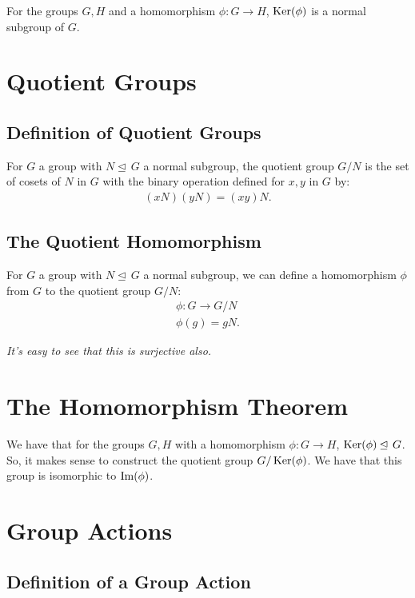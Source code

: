 \documentclass[a4paper, 12pt, twoside]{article}
\begin{document}
For the groups $G, H$ and a homomorphism $\phi : G \to H$,
$\operatorname{Ker}(\phi)$ is a normal subgroup of $G$.

\section{Quotient Groups}

\subsection{Definition of Quotient Groups}

For $G$ a group with $N \unlhd \, G$ a normal subgroup, the quotient
group $G/N$ is the set of cosets of $N$ in $G$ with the binary
operation defined for $x, y$ in $G$ by:
\begin{align*}
      (xN)(yN) = (xy)N.
\end{align*}

\subsection{The Quotient Homomorphism}

For $G$ a group with $N \unlhd \, G$ a normal subgroup, we can 
define a homomorphism $\phi$ from $G$ to the quotient group $G/N$:
\begin{gather*}
      \phi: G \to G/N \\
      \phi(g) = gN.
\end{gather*}

\textit{It's easy to see that this is surjective also.}

\newpage

\section{The Homomorphism Theorem}

We have that for the groups $G, H$ with a homomorphism 
$\phi : G \to H$, $\operatorname{Ker}(\phi) \unlhd \, G$. So, it makes sense to
construct the quotient group $G/\operatorname{Ker}(\phi)$. We have that this
group is isomorphic to $\operatorname{Im}(\phi)$.

\section{Group Actions}

\subsection{Definition of a Group Action}
\end{document}
